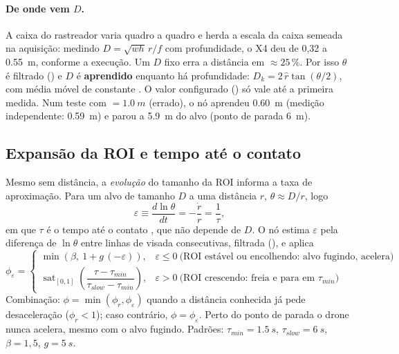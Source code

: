 \paragraph{De onde vem $D$.} A caixa do rastreador varia quadro a quadro e herda a escala da
caixa semeada na aquisição: medindo $D=\sqrt{wh}\,r/f$ com profundidade, o X4 deu de 0,32 a
\SI{0,55}{m}, conforme a execução. Um $D$ fixo erra a distância em $\approx25\,\%$. Por isso
$\theta$ é filtrado () e $D$ é \textbf{aprendido} enquanto há
profundidade: $D_k=2\,\hat r\tan(\theta/2)$, com média móvel de constante
. O valor configurado () só vale até a primeira
medida. Num teste com $=\SI{1,0}{m}$ (errado), o nó aprendeu
\SI{0,60}{m} (medição independente: \SI{0,59}{m}) e parou a \SI{5,9}{m} do alvo
(ponto de parada \SI{6}{m}).

\subsection{Expansão da ROI e tempo até o contato}
Mesmo sem distância, a \emph{evolução} do tamanho da ROI informa a taxa de aproximação.
Para um alvo de tamanho $D$ a uma distância $r$, $\theta\approx D/r$, logo
\begin{equation}
  \varepsilon\equiv\frac{d\ln\theta}{dt}=-\frac{\dot r}{r}=\frac1\tau,
\end{equation}
em que $\tau$ é o tempo até o contato \cite{lee2009ttc}, que não depende de $D$. O nó
estima $\varepsilon$ pela diferença de $\ln\theta$ entre linhas de visada consecutivas,
filtrada (), e aplica
\begin{equation}
  \phi_\varepsilon=\begin{cases}
    \min\!\left(\beta,\ 1+g\,(-\varepsilon)\right), & \varepsilon\le0
       \ \text{(ROI estável ou encolhendo: alvo fugindo, acelera)}\\[2pt]
    \operatorname{sat}_{[0,1]}\!\left(\dfrac{\tau-\tau_{min}}{\tau_{slow}-\tau_{min}}\right),
       & \varepsilon>0\ \text{(ROI crescendo: freia e para em } \tau_{min})
  \end{cases}
\end{equation}
Combinação: $\phi=\min(\phi_r,\phi_\varepsilon)$ quando a distância conhecida já pede
desaceleração ($\phi_r<1$); caso contrário, $\phi=\phi_\varepsilon$. Perto do ponto de parada
o drone nunca acelera, mesmo com o alvo fugindo. Padrões: $\tau_{min}=\SI{1,5}{s}$,
$\tau_{slow}=\SI{6}{s}$, $\beta=1{,}5$, $g=\SI{5}{s}$.

